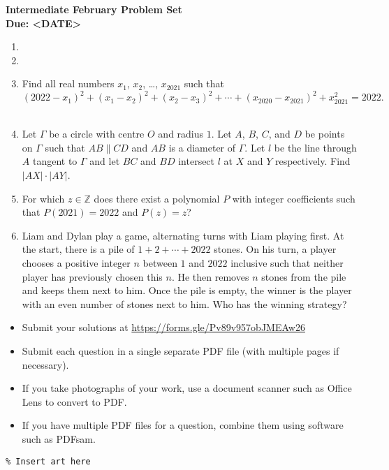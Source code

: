 \documentclass{article}
\begin{document}
\thispagestyle{empty}

\begin{center}
  \textbf{\Large Intermediate February Problem Set}
  \\ \vspace{1em}
  \textbf{\large Due: <DATE>}
\end{center}

\bigskip

\begin{enumerate}[itemsep=\fill]


\item %


\item %


\item %
Find all real numbers $x_1$, $x_2$, \ldots, $x_{2021}$ such that
\[ (2022-x_1)^2 +(x_1-x_2)^2 +(x_2-x_3)^2 +\dotsb +(x_{2020}-x_{2021})^2 +x_{2021}^2 = 2022. \]~


\item %
Let $\Gamma$ be a circle with centre $O$ and radius $1$.
Let $A$, $B$, $C$, and $D$ be points on $\Gamma$ such that $AB \parallel CD$ and $AB$ is a diameter of $\Gamma$.
Let $l$ be the line through $A$ tangent to $\Gamma$ and let $BC$ and $BD$ intersect $l$ at $X$ and $Y$ respectively.
Find $|AX| \cdot |AY|$.


\item %
For which $z \in \mathbb{Z}$ does there exist a polynomial $P$ with integer coefficients such that $P(2021) = 2022$ and $P(z) = z$?


\item %
Liam and Dylan play a game, alternating turns with Liam playing first.
At the start, there is a pile of $1 +2 +\dotsb +2022$ stones.
On his turn, a player chooses a positive integer $n$ between $1$ and $2022$ inclusive such that neither player has previously chosen this $n$.
He then removes $n$ stones from the pile and keeps them next to him.
Once the pile is empty, the winner is the player with an even number of stones next to him.
Who has the winning strategy? 

\end{enumerate}


\vfill
\small
\begin{itemize}
	\item Submit your solutions at \href{https://forms.gle/Pv89v957obJMEAw26}{https://forms.gle/Pv89v957obJMEAw26}
	\item Submit each question in a single separate PDF file (with multiple pages if necessary).
	\item If you take photographs of your work, use a document scanner such as Office Lens to convert to PDF.
	\item If you have multiple PDF files for a question, combine them using software such as PDFsam.
\end{itemize}

\vfill
\centering
\small
\begin{BVerbatim}
\end{BVerbatim}
\end{document}
